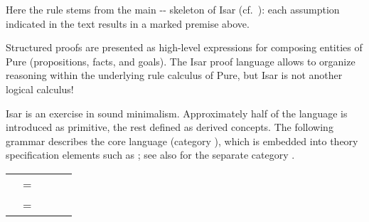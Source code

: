 \begin{isabellebody}
\begin{isamarkuptext}
  \noindent Here the  rule stems from the
  main \hyperlink{command.fix}{\mbox{}}-\hyperlink{command.assume}{\mbox{}}-\hyperlink{command.show}{\mbox{}} skeleton
  of Isar (cf.\ ): each assumption
  indicated in the text results in a marked premise  above.%
\end{isamarkuptext}%
\isamarkuptrue%
%
\isamarkuptrue%
%
\begin{isamarkuptext}%
Structured proofs are presented as high-level expressions for
  composing entities of Pure (propositions, facts, and goals).  The
  Isar proof language allows to organize reasoning within the
  underlying rule calculus of Pure, but Isar is not another logical
  calculus!

  Isar is an exercise in sound minimalism.  Approximately half of the
  language is introduced as primitive, the rest defined as derived
  concepts.  The following grammar describes the core language
  (category ), which is embedded into theory
  specification elements such as \hyperlink{command.theorem}{\mbox{}}; see also
   for the separate category .

  \medskip
  \begin{tabular}{rcl}
    \isa{{\isachardoublequote}theory{\isasymdash}stmt{\isachardoublequote}} & = & \hyperlink{command.theorem}{\mbox{\isa{\isacommand{theorem}}}}~\isa{{\isachardoublequote}statement\ proof\ \ {\isacharbar}{\isachardoublequote}}~~\hyperlink{command.definition}{\mbox{\isa{\isacommand{definition}}}}~\isa{{\isachardoublequote}{\isasymdots}\ \ {\isacharbar}\ \ {\isasymdots}{\isachardoublequote}} \\[1ex]

    \isa{{\isachardoublequote}proof{\isachardoublequote}} & = & \isa{{\isachardoublequote}prfx\isactrlsup {\isacharasterisk}{\isachardoublequote}}~\hyperlink{command.proof}{\mbox{\isa{\isacommand{proof}}}}~\isa{{\isachardoublequote}method\isactrlsup {\isacharquery}\ stmt\isactrlsup {\isacharasterisk}{\isachardoublequote}}~\hyperlink{command.qed}{\mbox{\isa{\isacommand{qed}}}}~\isa{{\isachardoublequote}method\isactrlsup {\isacharquery}{\isachardoublequote}} \\[1ex]


\end{tabular}
\end{isamarkuptext}
\end{isabellebody}
